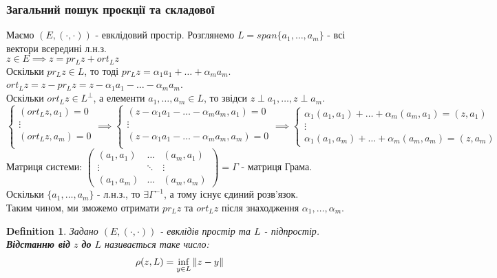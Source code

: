 \documentclass[a4paper, 10pt]{article}
\def\huge{\displaystyle}
\theoremstyle{theoremdd}
\theoremstyle{theoremdd}
\newtheorem{definition}[theorem]{Definition}
\theoremstyle{theoremdd}
\theoremstyle{theoremdd}
\theoremstyle{theoremdd}
\theoremstyle{theoremdd}
\theoremstyle{theoremdd}
\theoremstyle{theoremdd}
\begin{document}
\subsubsection*{Загальний пошук проєкції та складової}
Маємо $(E,(\cdot, \cdot))$ - евклідовий простір. Розглянемо $L = span\{a_1,\dots,a_m\}$ - всі вектори всередині л.н.з.\\
$z \in E \implies z = pr_L z + ort_L z$\\
Оскільки $pr_L z \in L$, то тоді $pr_L z = \alpha_1 a_1 + \dots + \alpha_m a_m$.\\
$ort_L z = z - pr_L z = \huge z - \alpha_1 a_1 - \dots - \alpha_m a_m$.\\
Оскільки $ort_L z \in L^\perp$, а елементи $a_1,\dots,a_m \in L$, то звідси $z \perp a_1, \dots, z \perp a_m$.\\
$\begin{cases}
(ort_L z, a_1) = 0 \\
\vdots \\
(ort_L z, a_m) = 0 \\
\end{cases} \implies
\begin{cases}
(\huge z - \alpha_1 a_1 - \dots - \alpha_m a_m, a_1) = 0 \\
\vdots \\
(\huge z - \alpha_1 a_1 - \dots - \alpha_m a_m,a_m) = 0 \\
\end{cases} \implies
\begin{cases}
\alpha_1 (a_1,a_1) + \dots + \alpha_m (a_m,a_1) = (z,a_1) \\
\vdots \\
\alpha_1 (a_1,a_m) + \dots + \alpha_m (a_m,a_m) = (z,a_m)
\end{cases}
$\\
Матриця системи: $\begin{pmatrix}
 (a_1,a_1) & \dots & (a_m,a_1) \\
 \vdots & \ddots & \vdots \\
 (a_1,a_m) & \dots & (a_m,a_m)
\end{pmatrix} = \Gamma$ - матриця Грама.\\
Оскільки $\{a_1,\dots,a_m\}$ - л.н.з., то $\exists \Gamma^{-1}$, а тому існує єдиний розв'язок.\\
Таким чином, ми зможемо отримати $pr_L z$ та $ort_L z$ після знаходження $\alpha_1,\dots,\alpha_m$.

\begin{definition}
Задано $(E,(\cdot,\cdot))$ - евклідів простір та $L$ - підпростір.\\
\textbf{Відстанню від} $z$ \textbf{до} $L$ називається таке число:
\begin{align*}
\rho (z,L) = \inf_{y \in L} \norm{z-y}
\end{align*}
\end{definition}
\end{document}
